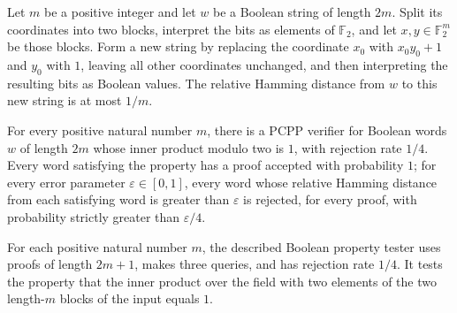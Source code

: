 \begin{theorem}
\label{FABL.relativeHammingDist_innerProductFlipNeighbor_le_one_div}
\leanok
{}
Let $m$ be a positive integer and let $w$ be a Boolean string of length $2m$. Split its
coordinates into two blocks, interpret the bits as elements of $\mathbb F_2$, and let
$x,y\in\mathbb F_2^m$ be those blocks. Form a new string by replacing the coordinate
$x_0$ with $x_0y_0+1$ and $y_0$ with $1$, leaving all other coordinates unchanged, and
then interpreting the resulting bits as Boolean values. The relative Hamming distance
from $w$ to this new string is at most $1/m$.
\end{theorem}

\begin{theorem}
\label{FABL.innerProductLinearPCPPSystem_isPCPP}
\leanok
{}
For every positive natural number $m$, there is a PCPP verifier for Boolean words $w$ of
length $2m$ whose inner product modulo two is $1$, with rejection rate $1/4$. Every word
satisfying the property has a proof accepted with probability $1$; for every
error parameter $\varepsilon\in[0,1]$, every word whose relative Hamming distance
from each satisfying word is greater than $\varepsilon$ is rejected, for every proof,
with probability strictly greater than $\varepsilon/4$.
\end{theorem}

\begin{definition}
\label{FABL.innerProductLinearPCPPDescription}
\leanok
{}
For each positive natural number $m$, the described Boolean property tester uses proofs
of length $2m+1$, makes three queries, and has rejection rate $1/4$. It tests the
property that the inner product over the field with two elements of the two length-$m$
blocks of the input equals $1$.
\end{definition}

